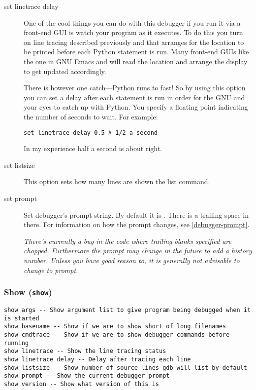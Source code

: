 \begin{description}
\item[set linetrace delay ]

One of the cool things you can do with this debugger if you run it via
a front-end GUI is watch your program as it executes. To do this you
turn on line tracing described previously  and
that arranges for the location to be printed before each Python
statement is run. Many front-end GUIs like the one in GNU Emacs and
 will read the location and arrange the display to get
updated accordingly. 

There is however one catch---Python runs to fast! So by using this
option you can set a delay after each statement is run in order for
the GNU and your eyes to catch up with Python. You specify a floating
point indicating the number of seconds to wait. For example: 

\begin{verbatim}
set linetrace delay 0.5 # 1/2 a second
\end{verbatim}

In my experience half a second is about right.

\item[set listsize ]

This option sets how many lines are shown the list command.

\item[set prompt ]\label{command:prompt}

Set debugger's prompt string. By default it is . There
is a trailing space in there. For information on how the prompt
changes, see \ref{debugger-prompt}.

\emph{There's currently a bug in the code where trailing blanks
specified are chopped. Furthermore the prompt may change in the future
to add a history number. Unless you have good reason to, it is
generally not advisable to change to prompt.}

\end{description}

\subsubsection{Show ({\tt show})\label{subsubsection:show}}

\begin{verbatim}
show args -- Show argument list to give program being debugged when it is started
show basename -- Show if we are to show short of long filenames
show cmdtrace -- Show if we are to show debugger commands before running
show linetrace -- Show the line tracing status
show linetrace delay -- Delay after tracing each line
show listsize -- Show number of source lines gdb will list by default
show prompt -- Show the current debugger prompt
show version -- Show what version of this is
\end{verbatim}

